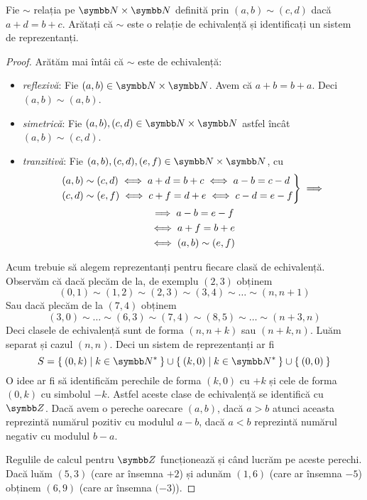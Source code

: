 \begin{exercise}
Fie \(\sim\) relația pe \(\naturals \times \naturals\) definită prin \((a, b) \sim (c, d)\) dacă \(a + d = b + c\). Arătați că \(\sim\) este o relație de echivalență și identificați un sistem de reprezentanți.
\end{exercise}
\begin{proof}
Arătăm mai întâi că \(\sim\) este de echivalență:
\begin{itemize}
    \item \emph{reflexivă}: Fie \((a, b) \in \naturals \times \naturals\). Avem că \(a + b = b + a\). Deci \((a, b) \sim (a, b)\).
    \item \emph{simetrică}: Fie \((a, b), (c, d) \in \naturals \times \naturals\) astfel încât \((a, b) \sim (c, d)\).
    \item \emph{tranzitivă}: Fie \((a, b), (c, d), (e, f) \in \naturals \times \naturals\), cu
    \begin{gather*}
        \begin{rcases*}
        (a, b) \sim (c, d) \iff a + d = b + c \iff a - b = c - d \\
        (c, d) \sim (e, f) \iff c + f = d + e \iff c - d = e - f
        \end{rcases*} \implies \\ \implies a - b = e - f \\
        \iff a + f = b + e \\
        \iff (a, b) \sim (e, f)
    \end{gather*}
\end{itemize}
Acum trebuie să alegem reprezentanți pentru fiecare clasă de echivalență. Observăm că dacă plecăm de la, de exemplu \((2, 3)\) obținem
\[
    (0, 1) \sim (1, 2) \sim (2, 3) \sim (3, 4) \sim \dots \sim (n, n + 1)
\]
Sau dacă plecăm de la \((7, 4)\) obținem
\[
    (3, 0) \sim \dots \sim (6, 3) \sim (7, 4) \sim (8, 5) \sim \dots \sim (n + 3, n)
\]
Deci clasele de echivalență sunt de forma \((n, n + k)\) sau \((n + k, n)\). Luăm separat și cazul \((n, n)\). Deci un sistem de reprezentanți ar fi
\[
    S = \Set{ (0, k) | k \in \naturals^* } \cup \Set{ (k, 0) | k \in \naturals^* } \cup \Set{ (0, 0) }
\]
O idee ar fi să identificăm perechile de forma \((k, 0)\) cu \(+k\) și cele de forma \((0, k)\) cu simbolul \(-k\). Astfel aceste clase de echivalență se identifică cu \(\integers\). Dacă avem o pereche oarecare \((a, b)\), dacă \(a > b\) atunci aceasta reprezintă numărul pozitiv cu modulul \(a - b\), dacă \(a < b\) reprezintă numărul negativ cu modulul \(b - a\).

Regulile de calcul pentru \(\integers\) funcționează și când lucrăm pe aceste perechi. Dacă luăm \((5, 3)\) (care ar însemna \(+2\)) și adunăm \((1, 6)\) (care ar însemna \(-5\)) obținem \((6, 9)\) (care ar însemna \((-3\))).
\end{proof}

